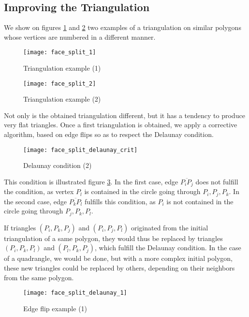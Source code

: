 \subsection*{Improving the Triangulation\label{sec:triangle_delaunay}}

We show on figures \ref{fig:algo.decoup_ex_1} and \ref{fig:algo.decoup_ex_2}
two examples of a triangulation on similar polygons whose vertices are
numbered in a different manner.

\begin{figure}[!h]
\centerline{
\texttt{[image: face\_split\_1]}}
\caption{Triangulation example (1)}
\label{fig:algo.decoup_ex_1}
\end{figure}

\begin{figure}[!h]
\centerline{
\texttt{[image: face\_split\_2]}}
\caption{Triangulation example (2)}
\label{fig:algo.decoup_ex_2}
\end{figure}

\vfill

Not only is the obtained triangulation different, but it has a tendency
to produce very flat triangles. Once a first triangulation is obtained,
we apply a corrective algorithm, based on edge flips so as to respect
the Delaunay condition.

\begin{figure}[!h]
\centerline{
\texttt{[image: face\_split\_delaunay\_crit]}}
\caption{Delaunay condition (2)}
\label{fig:algo.delaunay_cond}
\end{figure}

This condition is illustrated figure \ref{fig:algo.delaunay_cond}.
In the first case, edge $\overline{P_i P_j}$ does not fulfill the
condition, as vertex $P_l$ is contained in the circle going through
$P_i, P_j, P_k$. In the second case, edge $\overline{P_k P_l}$ fulfills
this condition, as $P_i$ is not contained in the circle going through
$P_j, P_k, P_l$.

If triangles $(P_i, P_k, P_j)$ and $(P_i, P_j, P_l)$ originated from
the initial triangulation of a same polygon, they would thus be replaced
by triangles $(P_i, P_k, P_l)$ and $(P_l, P_k, P_j)$, which
fulfill the Delaunay condition. In the case of a quadrangle, we
would be done, but with a more complex initial polygon,
these new triangles could be replaced by others, depending on their
neighbors from the same polygon.

\begin{figure}[!h]
\centerline{
\texttt{[image: face\_split\_delaunay\_1]}}
\caption{Edge flip example (1)}
\label{fig:algo.delaunay_ex_1}
\end{figure}

